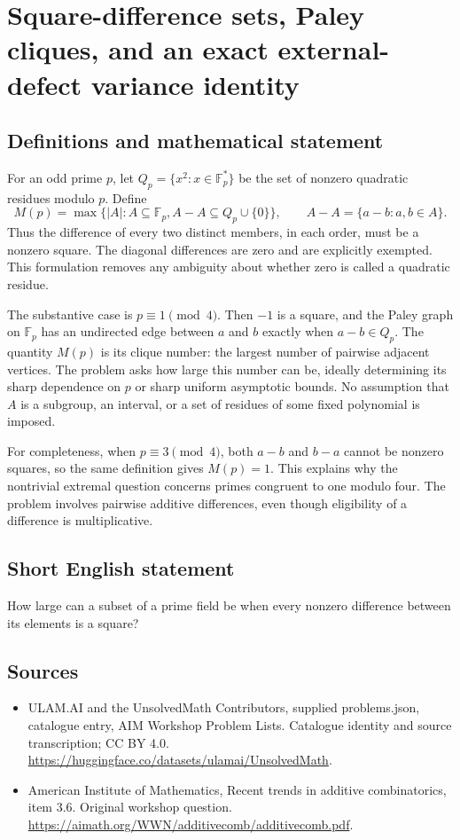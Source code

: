 \documentclass[11pt,a4paper]{article}
\begin{document}
\section*{Square-difference sets, Paley cliques, and an exact external-defect variance identity}\label{statement}

\subsection{Definitions and mathematical statement}
For an odd prime $p$, let
$Q_p=\{x^2:x\in\mathbb F_p^*\}$ be the set of nonzero quadratic
residues modulo $p$. Define
\[
 M(p)=\max\{|A|:A\subseteq\mathbb F_p,
                              A-A\subseteq Q_p\cup\{0\}\},
 \qquad A-A=\{a-b:a,b\in A\}.
\]
Thus the difference of every two distinct members, in each order,
must be a nonzero square. The diagonal differences are zero and
are explicitly exempted. This formulation removes any ambiguity
about whether zero is called a quadratic residue.

The substantive case is $p\equiv1\pmod4$. Then $-1$ is a square,
and the Paley graph on $\mathbb F_p$ has an undirected edge between
$a$ and $b$ exactly when $a-b\in Q_p$. The quantity $M(p)$ is
its clique number: the largest number of pairwise adjacent vertices.
The problem asks how large this number can be, ideally determining
its sharp dependence on $p$ or sharp uniform asymptotic bounds.
No assumption that $A$ is a subgroup, an interval, or a set of
residues of some fixed polynomial is imposed.

For completeness, when $p\equiv3\pmod4$, both $a-b$ and $b-a$
cannot be nonzero squares, so the same definition gives $M(p)=1$.
This explains why the nontrivial extremal question concerns primes
congruent to one modulo four. The problem involves pairwise additive
differences, even though eligibility of a difference is multiplicative.
\subsection{Short English statement}
How large can a subset of a prime field be when every nonzero difference between its elements is a square?
\subsection{Sources}
\begin{itemize}
\item[S1] ULAM.AI and the UnsolvedMath Contributors, supplied problems.json, catalogue entry, AIM Workshop Problem Lists. Catalogue identity and source transcription; CC BY 4.0.
\url{https://huggingface.co/datasets/ulamai/UnsolvedMath}.
\item[S2] American Institute of Mathematics, Recent trends in additive combinatorics, item 3.6. Original workshop question.
\url{https://aimath.org/WWN/additivecomb/additivecomb.pdf}.
\end{itemize}
\end{document}
